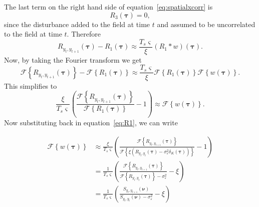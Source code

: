 \documentclass[]{article}
\begin{document}
The last term on the right hand side of equation~\ref{eq:spatialxcorr} is
\begin{equation}
	R_3(\boldsymbol{\tau}) = 0,
\end{equation}
since the disturbance added to the field at time $t$ and assumed to be uncorrelated to the field at time $t$. Therefore 
\begin{equation}
	R_{y_{t},y_{t+1}}(\boldsymbol{\tau}) - R_1(\boldsymbol{\tau}) \approx \frac{T_s \varsigma}{\xi} \left(R_1 \ast w\right)\left(\boldsymbol{\tau}\right).
\end{equation}
Now, by taking the Fourier transform we get
\begin{equation}
	\mathcal{F}\left\{R_{y_{t},y_{t+1}}(\boldsymbol{\tau})\right\} - \mathcal{F}\left\{R_1(\boldsymbol{\tau})\right\} \approx \frac{T_s \varsigma}{\xi} \mathcal{F}\left\{R_1(\boldsymbol{\tau})\right\} \mathcal{F}\left\{ w\left(\boldsymbol{\tau}\right)\right\}.
\end{equation}
This simplifies to
\begin{equation}
	\frac{\xi}{T_s \varsigma} \left(\frac{\mathcal{F}\left\{R_{y_{t},y_{t+1}}(\boldsymbol{\tau})\right\}}{\mathcal{F}\left\{R_1(\boldsymbol{\tau})\right\}} - 1\right) \approx  \mathcal{F}\left\{ w\left(\boldsymbol{\tau}\right)\right\}.
\end{equation}
Now substituting back in equation~\ref{eq:R1}, we can write

\begin{align}
	\mathcal{F}\left\{ w\left(\boldsymbol{\tau}\right)\right\} &\approx \frac{\xi}{T_s \varsigma} \left(\frac{\mathcal{F}\left\{R_{y_{t},y_{t+1}}(\boldsymbol{\tau})\right\}}{\mathcal{F}\left\{\xi\left( R_{y_{t},y_{t}}(\boldsymbol{\tau}) - \sigma_{\varepsilon}^2\delta_K\left(\boldsymbol{\tau}\right) \right)\right\}} - 1\right)  \\
	&= \frac{1}{T_s \varsigma} \left(\frac{\mathcal{F}\left\{R_{y_{t},y_{t+1}}(\boldsymbol{\tau})\right\}}{\mathcal{F}\left\{ R_{y_{t},y_{t}}(\boldsymbol{\tau})\right\} - \sigma_{\varepsilon}^2 } - \xi\right) \\
	&= \frac{1}{T_s \varsigma} \left(\frac{S_{y_{t},y_{t+1}}\left(\boldsymbol{\nu}\right)}{S_{y_{t},y_{t}}\left(\boldsymbol{\nu}\right) - \sigma_{\varepsilon}^2 } - \xi\right)
\end{align}
\end{document}

